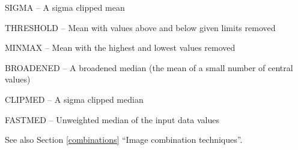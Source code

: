 \documentclass[twoside,11pt]{article}
\newcommand{\htmlref}[2]{#1}
\newcommand{\latexhtml}[2]{#1}
\renewcommand{\_}{\texttt{\symbol{95}}}
\newcommand{\secref}[2]{\latexhtml{Section \ref{#1} ``#2''}{``\htmlref{#2}{#1}''}}
\newcommand{\sstitem}{\item}
\newcommand{\sstitem}{\item}
\begin{document}
{{{{            \sstitem
               SIGMA     -- A sigma clipped mean

            \sstitem
               THRESHOLD -- Mean with values above and below given
                               limits removed

            \sstitem
               MINMAX    -- Mean with the highest and lowest values
                               removed

            \sstitem
               BROADENED -- A broadened median (the mean of a small
                               number of central values)
            \sstitem
               CLIPMED   -- A sigma clipped median

            \sstitem
               FASTMED   -- Unweighted median of the input data values
         }
         See also \secref{combinations}{Image combination techniques}.

}}}
\end{document}
